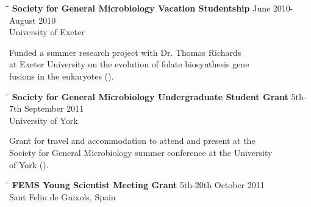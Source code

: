 \documentclass{res}
\begin{document}
\begin{resume}
\vspace{-0.1in}  
   \begin{tabbing}
   \hspace{2in}\= \hspace{2.6in}\= \kill 
    {\bf Society for General Microbiology Vacation Studentship} \> \>June 2010-August 2010\\
                            \> 
                            \> University of Exeter\\

   \end{tabbing}\vspace{-30pt}     
   Funded a summer research project with Dr. Thomas Richards \\  at Exeter University on the evolution of folate biosynthesis gene \\fusions in the eukaryotes ().

\vspace{-0.1in}  
   \begin{tabbing}
   \hspace{2in}\= \hspace{2.6in}\= \kill
    {\bf Society for General Microbiology Undergraduate Student Grant} \> \> 5th-7th September 2011\\
                            \> 
                            \> University of York \\

   \end{tabbing}\vspace{-30pt}      
 Grant for travel and accommodation to attend and present at the\\ Society for General Microbiology summer conference at the University\\ of York (). 

\vspace{-0.1in}  
   \begin{tabbing}
   \hspace{2in}\= \hspace{2.6in}\= \kill 
    {\bf FEMS Young Scientist Meeting Grant} \> \> 5th-20th October 2011\\
                            \>  
                            \> Sant Feliu de Guixols, Spain \\
                       
   \end{tabbing}\vspace{-30pt}      


\end{resume}
\end{document}

